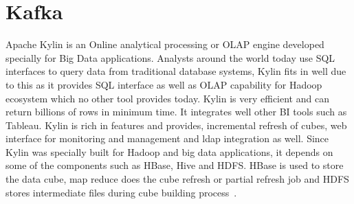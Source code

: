 \section{Kafka}

Apache Kylin is an Online analytical processing or OLAP engine developed 
specially for Big Data applications. Analysts around the world today 
use SQL interfaces to query data from traditional database systems, 
Kylin fits in well due to this as it provides SQL interface as well 
as OLAP capability for Hadoop ecosystem which no other tool provides 
today. Kylin is very efficient and can return billions of rows in 
minimum time. It integrates well other BI tools such as Tableau. 
Kylin is rich in features and provides, incremental refresh of cubes, 
web interface for monitoring and management and ldap integration as 
well. Since Kylin was specially built for Hadoop and big data 
applications, it depends on some of the components such as HBase, 
Hive and HDFS. HBase is used to store the data cube, map reduce does 
the cube refresh or partial refresh job and HDFS stores intermediate 
files during cube building process~\cite{hid-sp18-517-ApacheKylin}.


